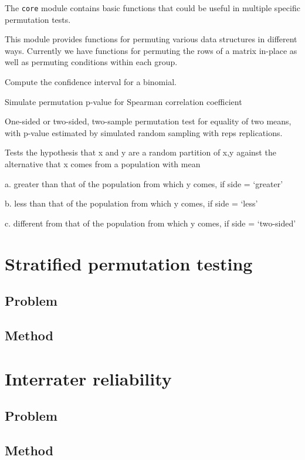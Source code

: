 The \texttt{core} module contains basic functions that could be useful in
multiple specific permutation tests.  

This module provides functions for permuting various data structures in
different ways.  Currently we have functions for permuting the rows of
a matrix in-place as well as permuting conditions within each group.


Compute the confidence interval for a binomial.


Simulate permutation p-value for Spearman correlation coefficient


One-sided or two-sided, two-sample permutation test for equality of two means,
with p-value estimated by simulated random sampling with reps replications.

Tests the hypothesis that x and y are a random partition of x,y against the
alternative that x comes from a population with mean

a. greater than that of the population from which y comes, if side = ‘greater’

b. less than that of the population from which y comes, if side = ‘less’

c. different from that of the population from which y comes, if side = ‘two-sided’

\section{Stratified permutation testing}

\subsection{Problem}

\subsection{Method}

\section{\label{sec:irr}Interrater reliability}

\subsection{Problem}

\cite{davies1982measuring, mchugh2012interrater}

\subsection{Method}

